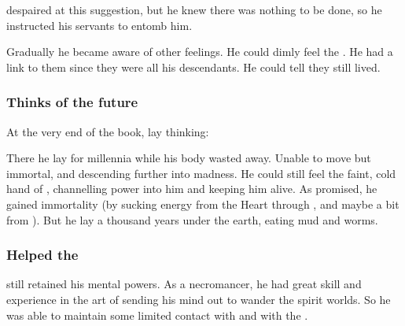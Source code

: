 \Semiza despaired at this suggestion, but he knew there was nothing to be done, so he instructed his servants to entomb him. 

\begin{prose}
\end{prose}

Gradually he became aware of other feelings. 
He could dimly feel the \resphain. 
He had a link to them since they were all his descendants. 
He could tell they still lived. 





\subsubsection{Thinks of the future}
At the very end of the book, \Semiza{} lay thinking: 
\begin{prose}
\end{prose}


There he lay for millennia while his body wasted away.
Unable to move but immortal, and descending further into madness. 
He could still feel the faint, cold hand of \Daggerrain{}, channelling power into him and keeping him alive. 
As \Daggerrain{} promised, he gained immortality (by sucking energy from the Heart through \Nyx, and maybe a bit from \Erebos). 
But he lay a thousand years under the earth, eating mud and worms. 





\subsubsection{Helped the \resphain}
\Semiza still retained his mental powers.
As a necromancer, he had great skill and experience in the art of sending his mind out to wander the spirit worlds.
So he was able to maintain some limited contact with \Daggerrain and with the \resphain.

